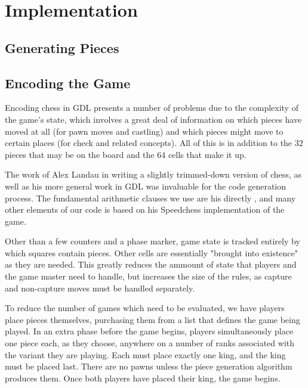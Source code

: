 \documentclass[11pt,letterpaper]{article}
\begin{document}
\section{Implementation}

\subsection{Generating Pieces}

\subsection{Encoding the Game}
Encoding chess in GDL presents a number of problems due to the complexity of the
game's state, which involves a great deal of information on which pieces have
moved at all (for pawn moves and castling) and which pieces might move to
certain places (for check and related concepts). All of this is in addition to
the \(32\) pieces that may be on the board and the \(64\) cells that make it up.

The work of Alex Landau in writing a slightly trimmed-down version of chess, as
well as his more general work in GDL was invaluable for the code generation
process. The fundamental arithmetic clauses we use are his directly
\cite{gdlmath}, and many other elements of our code is based on his Speedchess
\cite{spdchess} implementation of the game.

Other than a few counters and a phase marker, game state is tracked entirely by
which squares contain pieces. Other cells are essentially "brought into
existence" as they are needed. This greatly reduces the ammount of state that
players and the game master need to handle, but increases the size of the rules,
as capture and non-capture moves must be handled separately.

To reduce the number of games which need to be evaluated, we have players place
pieces themselves, purchasing them from a list that defines the game being
played. In an extra phase before the game begins, players simultaneously place
one piece each, as they choose, anywhere on a number of ranks associated with
the variant they are playing. Each must place exactly one king, and the king
must be placed last. There are no pawns unless the piece generation algorithm
produces them. Once both players have placed their king, the game begins.
\end{document}
